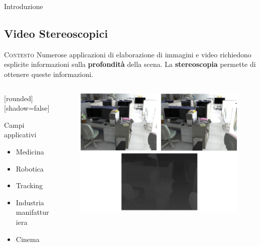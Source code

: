 \documentclass{beamer}
\begin{document}
\begin{section}{Introduzione}
\subsection{Video Stereoscopici}

\begin{frame}[t]{\textsc{Contesto}}
\centering
Numerose applicazioni di elaborazione di immagini e video richiedono esplicite informazioni sulla \textbf{profondit\`{a}} della scena. La \textbf{stereoscopia} permette di ottenere queste informazioni.
\setlength{\columnsep}{0cm}
\begin{columns}
\begin{column}{4cm}
\begin{center}
[rounded][shadow=false]
\begin{block}{Campi applicativi}
		\begin{itemize}
			\item \small{Medicina} 
			\item Robotica
			\item Tracking
			\item Industria manifatturiera
			\item Cinema
		\end{itemize}	
	\end{block}
\end{center}
\end{column}
\begin{column}{6cm}
\begin{figure}
\centering
\includegraphics[width=1\linewidth]{./img/track.png}
\end{figure}
\end{column}
\end{columns}
\end{frame}


\end{section}
\end{document}
